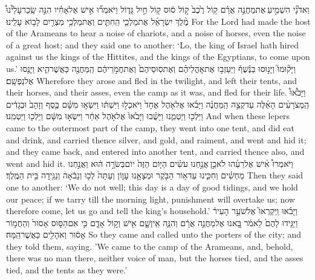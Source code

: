 {וַאדֹנָ֞י הִשְׁמִ֣יעַ \legarmeh  אֶת\maqqaf מַחֲנֵ֣ה אֲרָ֗ם ק֥וֹל רֶ֙כֶב֙ ק֣וֹל ס֔וּס ק֖וֹל חַ֣יִל גָּד֑וֹל וַיֹּאמְר֞וּ אִ֣ישׁ אֶל\maqqaf אָחִ֗יו הִנֵּ֣ה שָֽׂכַר\maqqaf עָלֵ֩ינוּ֩ מֶ֨לֶךְ יִשְׂרָאֵ֜ל אֶת\maqqaf מַלְכֵ֧י הַֽחִתִּ֛ים וְאֶת\maqqaf מַלְכֵ֥י מִצְרַ֖יִם לָב֥וֹא עָלֵֽינוּ׃}
{For the Lord had made the host of the Arameans to hear a noise of chariots, and a noise of horses, even the noise of a great host; and they said one to another: ‘Lo, the king of Israel hath hired against us the kings of the Hittites, and the kings of the Egyptians, to come upon us.’}
{וַיָּק֘וּמוּ֮ וַיָּנ֣וּסוּ בַנֶּ֒שֶׁף֒ וַיַּעַזְב֣וּ אֶת\maqqaf אׇהֳלֵיהֶ֗ם וְאֶת\maqqaf סֽוּסֵיהֶם֙ וְאֶת\maqqaf חֲמֹ֣רֵיהֶ֔ם הַֽמַּחֲנֶ֖ה כַּאֲשֶׁר\maqqaf הִ֑יא וַיָּנֻ֖סוּ אֶל\maqqaf נַפְשָֽׁם׃}
{Wherefore they arose and fled in the twilight, and left their tents, and their horses, and their asses, even the camp as it was, and fled for their life.}
{וַיָּבֹ֩אוּ֩ הַֽמְצֹרָעִ֨ים הָאֵ֜לֶּה עַד\maqqaf קְצֵ֣ה הַֽמַּחֲנֶ֗ה וַיָּבֹ֜אוּ אֶל\maqqaf אֹ֤הֶל אֶחָד֙ וַיֹּאכְל֣וּ וַיִּשְׁתּ֔וּ וַיִּשְׂא֣וּ מִשָּׁ֗ם כֶּ֤סֶף וְזָהָב֙ וּבְגָדִ֔ים וַיֵּלְכ֖וּ וַיַּטְמִ֑נוּ וַיָּשֻׁ֗בוּ וַיָּבֹ֙אוּ֙ אֶל\maqqaf אֹ֣הֶל אַחֵ֔ר וַיִּשְׂא֣וּ מִשָּׁ֔ם וַיֵּלְכ֖וּ וַיַּטְמִֽנוּ׃}
{And when these lepers came to the outermost part of the camp, they went into one tent, and did eat and drink, and carried thence silver, and gold, and raiment, and went and hid it; and they came back, and entered into another tent, and carried thence also, and went and hid it.}
{וַיֹּאמְרוּ֩ אִ֨ישׁ אֶל\maqqaf רֵעֵ֜הוּ לֹא\maqqaf כֵ֣ן \legarmeh  אֲנַ֣חְנוּ עֹשִׂ֗ים הַיּ֤וֹם הַזֶּה֙ יוֹם\maqqaf בְּשֹׂרָ֣ה ה֔וּא וַאֲנַ֣חְנוּ מַחְשִׁ֗ים וְחִכִּ֛ינוּ עַד\maqqaf א֥וֹר הַבֹּ֖קֶר וּמְצָאָ֣נוּ עָו֑וֹן וְעַתָּה֙ לְכ֣וּ וְנָבֹ֔אָה וְנַגִּ֖ידָה בֵּ֥ית הַמֶּֽלֶךְ׃}
{Then they said one to another: ‘We do not well; this day is a day of good tidings, and we hold our peace; if we tarry till the morning light, punishment will overtake us; now therefore come, let us go and tell the king’s household.’}
{וַיָּבֹ֗אוּ וַֽיִּקְרְאוּ֮ אֶל\maqqaf שֹׁעֵ֣ר הָעִיר֒ וַיַּגִּ֤ידוּ לָהֶם֙ לֵאמֹ֔ר בָּ֚אנוּ אֶל\maqqaf מַחֲנֵ֣ה אֲרָ֔ם וְהִנֵּ֧ה אֵֽין\maqqaf שָׁ֛ם אִ֖ישׁ וְק֣וֹל אָדָ֑ם כִּ֣י אִם\maqqaf הַסּ֤וּס אָסוּר֙ וְהַחֲמ֣וֹר אָס֔וּר וְאֹהָלִ֖ים כַּאֲשֶׁר\maqqaf הֵֽמָּה׃}
{So they came and called unto the porters of the city; and they told them, saying. 'We came to the camp of the Arameans, and, behold, there was no man there, neither voice of man, but the horses tied, and the asses tied, and the tents as they were.’}
